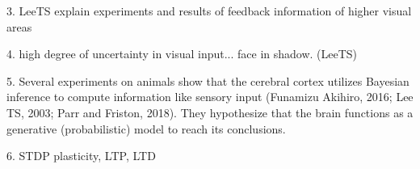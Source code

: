 3. LeeTS explain experiments and results of feedback information of higher visual areas

4. high degree of uncertainty in visual input... face in shadow. (LeeTS)

5. Several experiments on animals show that the cerebral
cortex utilizes Bayesian inference to compute information like sensory
input (Funamizu Akihiro, 2016; Lee TS, 2003; Parr and Friston, 2018). They
hypothesize that the brain functions as a generative (probabilistic) model
to reach its conclusions. 

6. STDP plasticity, LTP, LTD